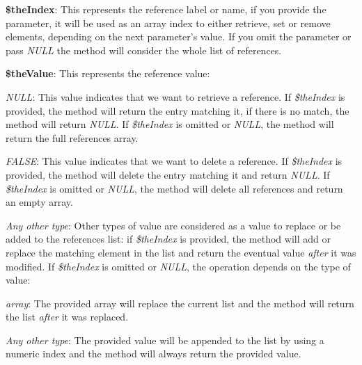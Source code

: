 \begin{DoxyItemize}
\item {\bfseries \$the\-Index}\-: This represents the reference label or name, if you provide the parameter, it will be used as an array index to either retrieve, set or remove elements, depending on the next parameter's value. If you omit the parameter or pass {\itshape N\-U\-L\-L\/} the method will consider the whole list of references. 
\item {\bfseries \$the\-Value}\-: This represents the reference value\-: 
\begin{DoxyItemize}
\item {\itshape N\-U\-L\-L\/}\-: This value indicates that we want to retrieve a reference. If {\itshape \$the\-Index\/} is provided, the method will return the entry matching it, if there is no match, the method will return {\itshape N\-U\-L\-L\/}. If {\itshape \$the\-Index\/} is omitted or {\itshape N\-U\-L\-L\/}, the method will return the full references array. 
\item {\itshape F\-A\-L\-S\-E\/}\-: This value indicates that we want to delete a reference. If {\itshape \$the\-Index\/} is provided, the method will delete the entry matching it and return {\itshape N\-U\-L\-L\/}. If {\itshape \$the\-Index\/} is omitted or {\itshape N\-U\-L\-L\/}, the method will delete all references and return an empty array. 
\item {\itshape Any other type\/}\-: Other types of value are considered as a value to replace or be added to the references list\-: if {\itshape \$the\-Index\/} is provided, the method will add or replace the matching element in the list and return the eventual value {\itshape after\/} it was modified. If {\itshape \$the\-Index\/} is omitted or {\itshape N\-U\-L\-L\/}, the operation depends on the type of value\-: 
\begin{DoxyItemize}
\item {\itshape array\/}\-: The provided array will replace the current list and the method will return the list {\itshape after\/} it was replaced. 
\item {\itshape Any other type\/}\-: The provided value will be appended to the list by using a numeric index and the method will always return the provided value. 
\end{DoxyItemize}
\end{DoxyItemize}
\end{DoxyItemize}


